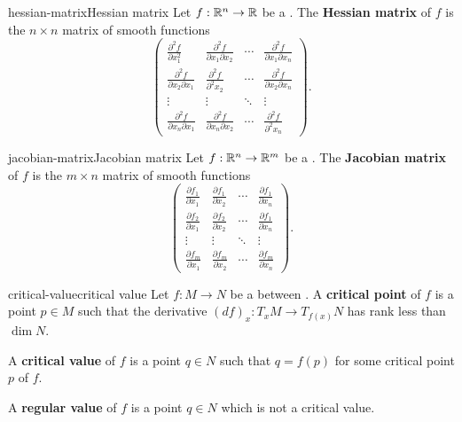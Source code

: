 \begin{topic}{hessian-matrix}{Hessian matrix}
    Let $f : \mathbb{R}^n \to \mathbb{R}$ be a . The \textbf{Hessian matrix} of $f$ is the $n \times n$ matrix of smooth functions
    \[ \begin{pmatrix}
        \frac{\partial^2 f}{\partial x_1^2} & \frac{\partial^2 f}{\partial x_1 \partial x_2} & \cdots & \frac{\partial^2 f}{\partial x_1 \partial x_n} \\
        \frac{\partial^2 f}{\partial x_2 \partial x_1} & \frac{\partial^2 f}{\partial^2 x_2} & \cdots & \frac{\partial^2 f}{\partial x_2 \partial x_n} \\
        \vdots & \vdots & \ddots & \vdots \\
        \frac{\partial^2 f}{\partial x_n \partial x_1} & \frac{\partial^2 f}{\partial x_n \partial x_2} & \cdots & \frac{\partial^2 f}{\partial^2 x_n}
    \end{pmatrix} . \]
\end{topic}

\begin{topic}{jacobian-matrix}{Jacobian matrix}
    Let $f : \mathbb{R}^n \to \mathbb{R}^m$ be a . The \textbf{Jacobian matrix} of $f$ is the $m \times n$ matrix of smooth functions
    \[ \begin{pmatrix}
        \frac{\partial f_1}{\partial x_1} & \frac{\partial f_1}{\partial x_2} & \cdots & \frac{\partial f_1}{\partial x_n} \\
        \frac{\partial f_2}{\partial x_1} & \frac{\partial f_2}{\partial x_2} & \cdots & \frac{\partial f_1}{\partial x_n} \\
        \vdots & \vdots & \ddots & \vdots \\
        \frac{\partial f_m}{\partial x_1} & \frac{\partial f_m}{\partial x_2} & \cdots & \frac{\partial f_m}{\partial x_n}
    \end{pmatrix} . \]
\end{topic}

\begin{topic}{critical-value}{critical value}
    Let $f : M \to N$ be a  between . A \textbf{critical point} of $f$ is a point $p \in M$ such that the derivative $(df)_x : T_x M \to T_{f(x)} N$ has rank less than $\dim N$.
    
    A \textbf{critical value} of $f$ is a point $q \in N$ such that $q = f(p)$ for some critical point $p$ of $f$.
    
    A \textbf{regular value} of $f$ is a point $q \in N$ which is not a critical value.
\end{topic}

